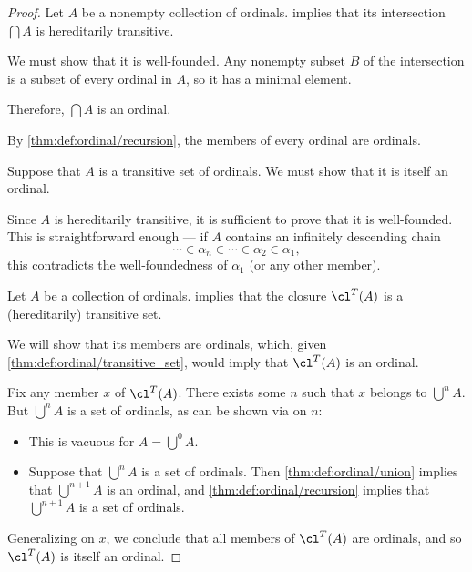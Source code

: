 \begin{proof}
   Let \( A \) be a nonempty collection of ordinals.  implies that its intersection \( \bigcap A \) is hereditarily transitive.

  We must show that it is well-founded. Any nonempty subset \( B \) of the intersection is a subset of every ordinal in \( A \), so it has a minimal element.

  Therefore, \( \bigcap A \) is an ordinal.


  \SufficiencySubProof* By \cref{thm:def:ordinal/recursion}, the members of every ordinal are ordinals.

  \NecessitySubProof* Suppose that \( A \) is a transitive set of ordinals. We must show that it is itself an ordinal.

  Since \( A \) is hereditarily transitive, it is sufficient to prove that it is well-founded. This is straightforward enough --- if \( A \) contains an infinitely descending chain
  \begin{equation*}
    \cdots \in \alpha_n \in \cdots \in \alpha_2 \in \alpha_1,
  \end{equation*}
  this contradicts the well-foundedness of \( \alpha_1 \) (or any other member).

   Let \( A \) be a collection of ordinals.  implies that the closure \( \cl^T(A) \) is a (hereditarily) transitive set.

  We will show that its members are ordinals, which, given \cref{thm:def:ordinal/transitive_set}, would imply that \( \cl^T(A) \) is an ordinal.

  Fix any member \( x \) of \( \cl^T(A) \). There exists some \( n \) such that \( x \) belongs to \( {\bigcup}^n A \). But \( {\bigcup}^n A \) is a set of ordinals, as can be shown via  on \( n \):
  \begin{itemize}
    \item This is vacuous for \( A = {\bigcup}^0 A \).
    \item Suppose that \( {\bigcup}^n A \) is a set of ordinals. Then \cref{thm:def:ordinal/union} implies that \( {\bigcup}^{n+1} A \) is an ordinal, and \cref{thm:def:ordinal/recursion} implies that \( {\bigcup}^{n+1} A \) is a set of ordinals.
  \end{itemize}

  Generalizing on \( x \), we conclude that all members of \( \cl^T(A) \) are ordinals, and so \( \cl^T(A) \) is itself an ordinal.
\end{proof}

